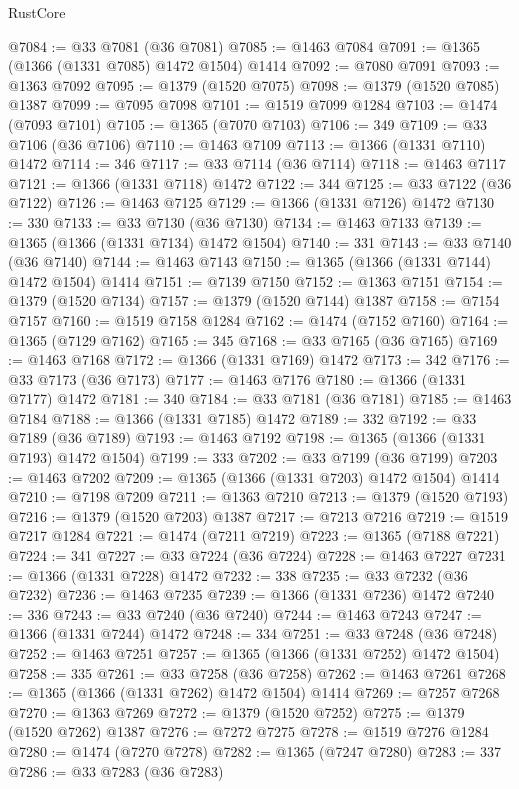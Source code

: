 \begin{lexlean}{RustCore}
\begin{coremodule}
@7084 := @33 @7081 (@36 @7081)
@7085 := @1463 @7084
@7091 := @1365 (@1366 (@1331 @7085) @1472 @1504) @1414
@7092 := @7080 @7091
@7093 := @1363 @7092
@7095 := @1379 (@1520 @7075)
@7098 := @1379 (@1520 @7085) @1387
@7099 := @7095 @7098
@7101 := @1519 @7099 @1284
@7103 := @1474 (@7093 @7101)
@7105 := @1365 (@7070 @7103)
@7106 := 349
@7109 := @33 @7106 (@36 @7106)
@7110 := @1463 @7109
@7113 := @1366 (@1331 @7110) @1472
@7114 := 346
@7117 := @33 @7114 (@36 @7114)
@7118 := @1463 @7117
@7121 := @1366 (@1331 @7118) @1472
@7122 := 344
@7125 := @33 @7122 (@36 @7122)
@7126 := @1463 @7125
@7129 := @1366 (@1331 @7126) @1472
@7130 := 330
@7133 := @33 @7130 (@36 @7130)
@7134 := @1463 @7133
@7139 := @1365 (@1366 (@1331 @7134) @1472 @1504)
@7140 := 331
@7143 := @33 @7140 (@36 @7140)
@7144 := @1463 @7143
@7150 := @1365 (@1366 (@1331 @7144) @1472 @1504) @1414
@7151 := @7139 @7150
@7152 := @1363 @7151
@7154 := @1379 (@1520 @7134)
@7157 := @1379 (@1520 @7144) @1387
@7158 := @7154 @7157
@7160 := @1519 @7158 @1284
@7162 := @1474 (@7152 @7160)
@7164 := @1365 (@7129 @7162)
@7165 := 345
@7168 := @33 @7165 (@36 @7165)
@7169 := @1463 @7168
@7172 := @1366 (@1331 @7169) @1472
@7173 := 342
@7176 := @33 @7173 (@36 @7173)
@7177 := @1463 @7176
@7180 := @1366 (@1331 @7177) @1472
@7181 := 340
@7184 := @33 @7181 (@36 @7181)
@7185 := @1463 @7184
@7188 := @1366 (@1331 @7185) @1472
@7189 := 332
@7192 := @33 @7189 (@36 @7189)
@7193 := @1463 @7192
@7198 := @1365 (@1366 (@1331 @7193) @1472 @1504)
@7199 := 333
@7202 := @33 @7199 (@36 @7199)
@7203 := @1463 @7202
@7209 := @1365 (@1366 (@1331 @7203) @1472 @1504) @1414
@7210 := @7198 @7209
@7211 := @1363 @7210
@7213 := @1379 (@1520 @7193)
@7216 := @1379 (@1520 @7203) @1387
@7217 := @7213 @7216
@7219 := @1519 @7217 @1284
@7221 := @1474 (@7211 @7219)
@7223 := @1365 (@7188 @7221)
@7224 := 341
@7227 := @33 @7224 (@36 @7224)
@7228 := @1463 @7227
@7231 := @1366 (@1331 @7228) @1472
@7232 := 338
@7235 := @33 @7232 (@36 @7232)
@7236 := @1463 @7235
@7239 := @1366 (@1331 @7236) @1472
@7240 := 336
@7243 := @33 @7240 (@36 @7240)
@7244 := @1463 @7243
@7247 := @1366 (@1331 @7244) @1472
@7248 := 334
@7251 := @33 @7248 (@36 @7248)
@7252 := @1463 @7251
@7257 := @1365 (@1366 (@1331 @7252) @1472 @1504)
@7258 := 335
@7261 := @33 @7258 (@36 @7258)
@7262 := @1463 @7261
@7268 := @1365 (@1366 (@1331 @7262) @1472 @1504) @1414
@7269 := @7257 @7268
@7270 := @1363 @7269
@7272 := @1379 (@1520 @7252)
@7275 := @1379 (@1520 @7262) @1387
@7276 := @7272 @7275
@7278 := @1519 @7276 @1284
@7280 := @1474 (@7270 @7278)
@7282 := @1365 (@7247 @7280)
@7283 := 337
@7286 := @33 @7283 (@36 @7283)

\end{coremodule}
\end{lexlean}
